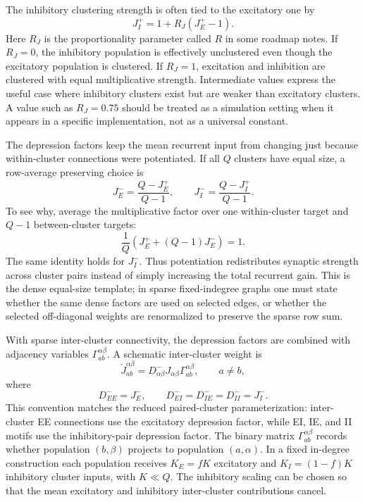 The inhibitory clustering strength is often tied to the excitatory one by
\begin{equation}
    J_I^+ = 1 + R_J\left(J_E^+ - 1\right).
    \label{eq:ch08-inhibitory-strength}
\end{equation}
Here \(R_J\) is the proportionality parameter called \(R\) in some roadmap
notes. If \(R_J=0\), the inhibitory population is effectively unclustered even
though the excitatory population is clustered. If \(R_J=1\), excitation and
inhibition are clustered with equal multiplicative strength. Intermediate
values express the useful case where inhibitory clusters exist but are weaker
than excitatory clusters. A value such as \(R_J=0.75\) should be treated as a
simulation setting when it appears in a specific implementation, not as a
universal constant.

The depression factors keep the mean recurrent input from changing just because
within-cluster connections were potentiated. If all \(Q\) clusters have equal
size, a row-average preserving choice is
\begin{equation}
    J_E^- = \frac{Q-J_E^+}{Q-1},
    \qquad
    J_I^- = \frac{Q-J_I^+}{Q-1}.
    \label{eq:ch08-depression-factors}
\end{equation}
To see why, average the multiplicative factor over one within-cluster target
and \(Q-1\) between-cluster targets:
\begin{equation}
    \frac{1}{Q}\left(J_E^+ + (Q-1)J_E^-\right)=1.
\end{equation}
The same identity holds for \(J_I^-\). Thus potentiation redistributes synaptic
strength across cluster pairs instead of simply increasing the total recurrent
gain. This is the dense equal-size template; in sparse fixed-indegree graphs one
must state whether the same dense factors are used on selected edges, or whether
the selected off-diagonal weights are renormalized to preserve the sparse row
sum.

With sparse inter-cluster connectivity, the depression factors are combined
with adjacency variables \(\Gamma_{ab}^{\alpha\beta}\). A schematic inter-cluster
weight is
\begin{equation}
    \check J_{ab}^{\alpha\beta}
    =
    D_{\alpha\beta}^{-} J_{\alpha\beta}\Gamma_{ab}^{\alpha\beta},
    \qquad a\ne b,
    \label{eq:ch08-intercluster-weight}
\end{equation}
where
\begin{equation}
    D_{EE}^{-}=J_E^-,
    \qquad
    D_{EI}^{-}=D_{IE}^{-}=D_{II}^{-}=J_I^- .
    \label{eq:ch08-depression-motifs}
\end{equation}
This convention matches the reduced paired-cluster parameterization:
inter-cluster EE connections use the excitatory depression factor, while EI,
IE, and II motifs use the inhibitory-pair depression factor. The binary matrix
\(\Gamma_{ab}^{\alpha\beta}\) records whether population \((b,\beta)\) projects
to population \((a,\alpha)\). In a fixed in-degree construction each population
receives \(K_E=fK\) excitatory and \(K_I=(1-f)K\) inhibitory cluster inputs, with
\(K\ll Q\). The inhibitory scaling can be chosen so that the mean excitatory and
inhibitory inter-cluster contributions cancel.

